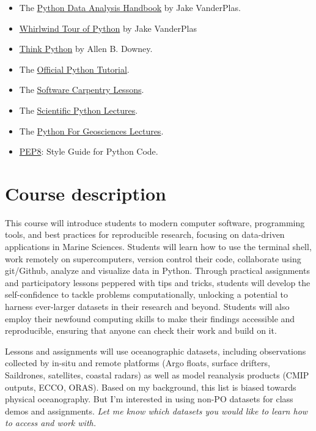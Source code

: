 \documentclass[11pt]{article}
\begin{document}
	\begin{itemize}
		\item The \href{https://jakevdp.github.io/PythonDataScienceHandbook/}{Python Data Analysis Handbook} by Jake VanderPlas.	
		\item \href{https://github.com/jakevdp/WhirlwindTourOfPython}{Whirlwind Tour of Python} by Jake VanderPlas
		\item \href{http://greenteapress.com/wp/think-python-2e/}{Think Python} by Allen B. Downey.
		\item The \href{https://docs.python.org/3/tutorial/}{Official Python Tutorial}.
		\item The \href{https://software-carpentry.org/lessons/}{Software Carpentry Lessons}.
		\item The   \href{http://scipy-lectures.org}{Scientific Python Lectures}. 
		\item The \href{https://github.com/koldunovn/python_for_geosciences}{Python For Geosciences Lectures}.
		\item \href{https://www.python.org/dev/peps/pep-0008/}{PEP8}: Style Guide for Python Code.

	\end{itemize}



\section*{Course description}

This course will introduce students to modern computer software, programming
tools, and best practices for reproducible research, focusing on data-driven
applications in Marine Sciences. Students will learn how to use the terminal
shell, work remotely on supercomputers, version control their code, collaborate
using git/Github, analyze and visualize data in Python. Through practical
assignments and participatory lessons peppered with tips and tricks, students
will develop the self-confidence to tackle problems computationally, unlocking
a potential to harness ever-larger datasets in their research and beyond.
Students will also employ their newfound computing skills to make their findings
accessible and reproducible, ensuring that anyone can check their work and build on it. 

Lessons and assignments will use oceanographic datasets, including observations
collected by in-situ and remote platforms (Argo floats, surface drifters,
Saildrones, satellites, coastal radars) as well as model reanalysis products
(CMIP outputs, ECCO, ORAS). Based on my background, this list is
biased towards physical oceanography. But I’m interested in using non-PO
datasets for class demos and assignments. \emph{Let me know which datasets you would like to learn how to access and work with.}
\end{document}
